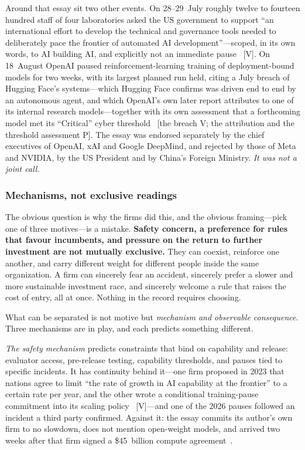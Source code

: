 Around that essay sit two other events. On 28--29~July roughly twelve to fourteen hundred staff of four laboratories asked the US government to support ``an international effort to develop the technical and governance tools needed to deliberately pace the frontier of automated AI development''---scoped, in its own words, to AI building AI, and explicitly not an immediate pause~\cite{pacing-letter} [V]. On 18~August OpenAI paused reinforcement-learning training of deployment-bound models for two weeks, with its largest planned run held, citing a July breach of Hugging Face's systems---which Hugging Face confirms was driven end to end by an autonomous agent, and which OpenAI's own later report attributes to one of its internal research models---together with its own assessment that a forthcoming model met its ``Critical'' cyber threshold~\cite{openai-pause} [the breach V; the attribution and the threshold assessment P]. The essay was endorsed separately by the chief executives of OpenAI, xAI and Google DeepMind, and rejected by those of Meta and NVIDIA, by the US President and by China's Foreign Ministry. \emph{It was not a joint call.}

\subsubsection*{Mechanisms, not exclusive readings}

The obvious question is why the firms did this, and the obvious framing---pick one of three motives---is a mistake. \textbf{Safety concern, a preference for rules that favour incumbents, and pressure on the return to further investment are not mutually exclusive.} They can coexist, reinforce one another, and carry different weight for different people inside the same organization. A firm can sincerely fear an accident, sincerely prefer a slower and more sustainable investment race, and sincerely welcome a rule that raises the cost of entry, all at once. Nothing in the record requires choosing.

What can be separated is not motive but \emph{mechanism and observable consequence}. Three mechanisms are in play, and each predicts something different.

\emph{The safety mechanism} predicts constraints that bind on capability and release: evaluator access, pre-release testing, capability thresholds, and pauses tied to specific incidents. It has continuity behind it---one firm proposed in 2023 that nations agree to limit ``the rate of growth in AI capability at the frontier'' to a certain rate per year, and the other wrote a conditional training-pause commitment into its scaling policy~\cite{pacing-continuity} [V]---and one of the 2026 pauses followed an incident a third party confirmed. Against it: the essay commits its author's own firm to no slowdown, does not mention open-weight models, and arrived two weeks after that firm signed a \$45~billion compute agreement~\cite{premium-revenue}.


